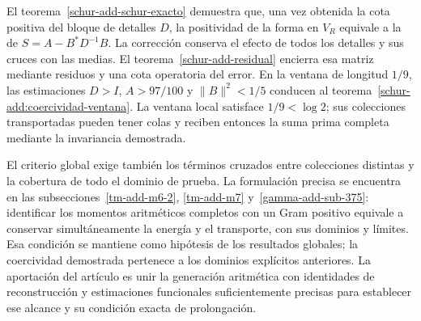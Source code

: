 El teorema~\ref{schur-add-schur-exacto} demuestra que, una vez
obtenida la cota positiva del bloque de detalles $D$, la positividad
de la forma en $V_R$ equivale a la de
$S=A-B^*D^{-1}B$. La corrección conserva el efecto de todos
los detalles y sus cruces con las medias. El
teorema~\ref{schur-add-residual} encierra esa matriz mediante
residuos y una cota operatoria del error. En la ventana de
longitud $1/9$, las estimaciones
$D>I$, $A>97/100$ y $\|B\|^2<1/5$ conducen al
teorema~\ref{schur-add:coercividad-ventana}. La ventana local
satisface $1/9<\log2$; sus colecciones transportadas pueden
tener colas y reciben entonces la suma prima completa mediante
la invariancia demostrada.

El criterio global exige también los términos cruzados entre
colecciones distintas y la cobertura de todo el dominio de prueba.
La formulación precisa se encuentra en las
subsecciones~\ref{tm-add-m6-2}, \ref{tm-add-m7}
y~\ref{gamma-add-sub-375}: identificar los momentos
aritméticos completos con un Gram positivo equivale a conservar
simultáneamente la energía y el transporte, con sus dominios
y límites. Esa condición se mantiene como hipótesis de los
resultados globales; la coercividad demostrada pertenece a los
dominios explícitos anteriores. La aportación del artículo es
unir la generación aritmética con identidades de reconstrucción
y estimaciones funcionales suficientemente precisas para
establecer ese alcance y su condición exacta de prolongación.
\clearpage
